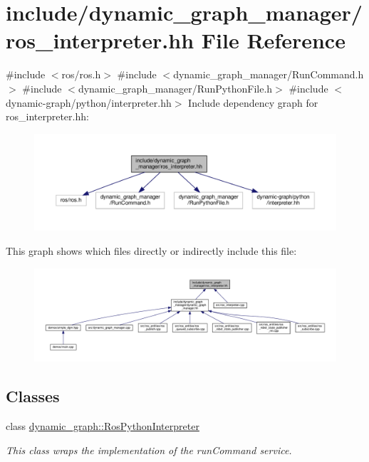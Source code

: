 \hypertarget{ros__interpreter_8hh}{}\section{include/dynamic\+\_\+graph\+\_\+manager/ros\+\_\+interpreter.hh File Reference}
\label{ros__interpreter_8hh}
{\ttfamily \#include $<$ros/ros.\+h$>$}\newline
{\ttfamily \#include $<$dynamic\+\_\+graph\+\_\+manager/\+Run\+Command.\+h$>$}\newline
{\ttfamily \#include $<$dynamic\+\_\+graph\+\_\+manager/\+Run\+Python\+File.\+h$>$}\newline
{\ttfamily \#include $<$dynamic-\/graph/python/interpreter.\+hh$>$}\newline
Include dependency graph for ros\+\_\+interpreter.\+hh\+:
\nopagebreak
\begin{figure}[H]
\begin{center}
\leavevmode
\includegraphics[width=350pt]{ros__interpreter_8hh__incl}
\end{center}
\end{figure}
This graph shows which files directly or indirectly include this file\+:
\nopagebreak
\begin{figure}[H]
\begin{center}
\leavevmode
\includegraphics[width=350pt]{ros__interpreter_8hh__dep__incl}
\end{center}
\end{figure}
\subsection*{Classes}
\begin{DoxyCompactItemize}
\item 
class \hyperlink{classdynamic__graph_1_1RosPythonInterpreter}{dynamic\+\_\+graph\+::\+Ros\+Python\+Interpreter}
\begin{DoxyCompactList}\small\item\em This class wraps the implementation of the run\+Command service. \end{DoxyCompactList}\end{DoxyCompactItemize}
